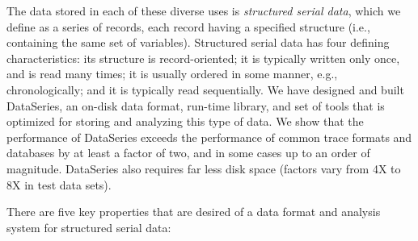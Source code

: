 \documentclass{acm_proc_article-sp}
\begin{document}
The data stored in each of these diverse uses is {\it structured
serial data}, which we define as a series of records, each record
having a specified structure (i.e., containing the same set of
variables). Structured serial data has four defining characteristics:
its structure is record-oriented; it is typically written only once,
and is read many times; it is usually ordered
in some manner, e.g., chronologically; and it is typically read
sequentially.  We have designed and built DataSeries, an on-disk 
data format, run-time library, and set of
tools that is optimized for storing and analyzing this type of data.
We show that the performance of DataSeries
exceeds the performance of common trace formats and databases by at
least a factor of two, and in some cases up to an order of
magnitude. DataSeries also requires far less disk space (factors vary
from 4X to 8X in test data sets).


There are five key properties that are desired of a data format
and analysis system for structured serial data:
\end{document}
